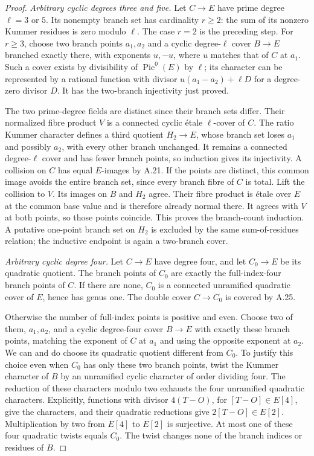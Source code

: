 \begin{proof}
\emph{Arbitrary cyclic degrees three and five.}
Let $C\to E$ have prime degree $\ell=3$ or $5$. Its
nonempty branch set has cardinality $r\ge2$: the sum of
its nonzero Kummer residues is zero modulo $\ell$.
The case $r=2$ is the preceding step. For $r\ge3$,
choose two branch points $a_1,a_2$ and a cyclic
degree-$\ell$ cover $B\to E$ branched exactly there,
with exponents $u,-u$, where $u$ matches that of $C$ at
$a_1$. Such a cover exists by divisibility of
$\operatorname{Pic}^0(E)$ by $\ell$; its character can
be represented by a rational function with divisor
$u(a_1-a_2)+\ell D$ for a degree-zero divisor $D$.
It has the two-branch injectivity just proved.

The two prime-degree fields are distinct since their
branch sets differ. Their normalized fibre product $V$
is a connected cyclic \'etale $\ell$-cover of $C$.
The ratio Kummer character defines a third quotient
$H_2\to E$, whose branch set loses $a_1$ and possibly
$a_2$, with every other branch unchanged. It remains a
connected degree-$\ell$ cover and has fewer branch
points, so induction gives its injectivity. A collision
on $C$ has equal $E$-images by A.21. If the points are
distinct, this common image avoids the entire branch
set, since every branch fibre of $C$ is total. Lift the
collision to $V$. Its images on $B$ and $H_2$ agree.
Their fibre product is \'etale over $E$ at the common
base value and is therefore already normal there. It
agrees with $V$ at both points, so those points coincide.
This proves the branch-count induction. A putative
one-point branch set on $H_2$ is excluded by the same
sum-of-residues relation; the inductive endpoint is
again a two-branch cover.

\emph{Arbitrary cyclic degree four.}
Let $C\to E$ have degree four, and let $C_0\to E$ be
its quadratic quotient. The branch points of $C_0$ are
exactly the full-index-four branch points of $C$.
If there are none, $C_0$ is a connected unramified
quadratic cover of $E$, hence has genus one. The double
cover $C\to C_0$ is covered by A.25.

Otherwise the number of full-index points is positive
and even. Choose two of them, $a_1,a_2$, and a cyclic
degree-four cover $B\to E$ with exactly these branch
points, matching the exponent of $C$ at $a_1$ and using
the opposite exponent at $a_2$. We can and do choose
its quadratic quotient different from $C_0$. To justify
this choice even when $C_0$ has only these two branch
points, twist the Kummer character of $B$ by an
unramified cyclic character of order dividing four.
The reduction of these characters modulo two exhausts
the four unramified quadratic characters. Explicitly,
functions with divisor $4(T-O)$, for $[T-O]\in E[4]$,
give the characters, and their quadratic reductions
give $2[T-O]\in E[2]$. Multiplication by two from
$E[4]$ to $E[2]$ is surjective. At most one of these
four quadratic twists equals $C_0$. The twist changes
none of the branch indices or residues of $B$.


\end{proof}
